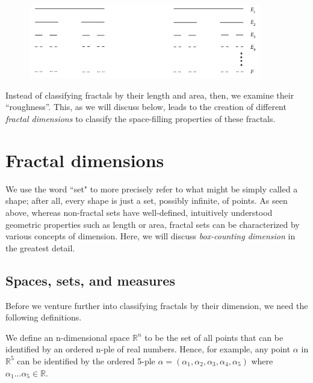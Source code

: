 \begin{figure}[ht]
\centering
\includegraphics[width=0.9\textwidth]{Chapters/Figures/cantorset.png} 
\caption[Middle-third Cantor set]{}\label{fig:cantorset}
\end{figure}










Instead of classifying fractals by their length and area, then, we examine their ``roughness''. This, as we will discuss below, leads to the creation of different \textit{fractal dimensions} to classify the space-filling properties of these fractals.














\section{Fractal dimensions}

We use the word ``set" to more precisely refer to what might be simply called a shape; after all, every shape is just a set, possibly infinite, of points. As seen above, whereas non-fractal sets have well-defined, intuitively understood geometric properties such as length or area, fractal sets can be characterized by various concepts of dimension. Here, we will discuss \textit{box-counting dimension} in the greatest detail.

\subsection{Spaces, sets, and measures}

Before we venture further into classifying fractals by their dimension, we need the following definitions.

\begin{mydef}
We define an n-dimensional space $ \mathbb{R}^{n} $ to be the set of all points that can be identified by an ordered n-ple of real numbers. Hence, for example, any point $ \alpha $ in $ \mathbb{R}^{5} $ can be identified by the ordered 5-ple $ \alpha = (\alpha_{1}, \alpha_{2}, \alpha_{3}, \alpha_{4}, \alpha_{5})$ where $ \alpha_{1} ... \alpha_{5} \in \mathbb{R} $.\end{mydef}

